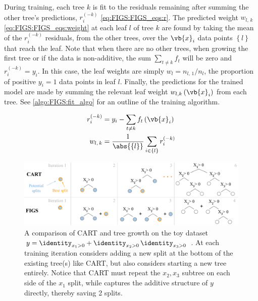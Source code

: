 During training, each tree $k$ is fit to the residuals remaining after summing the other tree's predictions,
$r_{i}^{\left(-k\right)}$ \cref{eq:FIGS:FIGS_eqs:r}.
The predicted weight $w_{l,\,k}$ \cref{eq:FIGS:FIGS_eqs:weight} at each leaf $l$ of tree $k$
are found by taking the mean of the $r_{i}^{\left(-k\right)}$ residuals, from the other trees,
over the $\vb{x}_{i}$ data points $\left\{l\right\}$ that reach the leaf.
Note that when there are no other trees,
\eg when growing the first tree or if the data is non-additive,
the sum $\sum_{t \neq k} f_{t}$ will be zero and $r_{i}^{\left(-k\right)} = y_{i}$.
In this case, the leaf weights are simply $w_{l} = n_{l,\,1}/n_{l}$,
\ie the proportion of positive $y_{i} = 1$ data points in leaf $l$.
Finally, the predictions for the trained model are made by
summing the relevant leaf weight $w_{l,k}\left(\vb{x}_{i}\right)$ from each tree.
See \cref{algo:FIGS:fit_algo} for an outline of the training algorithm.

\begin{subequations}\label{eq:FIGS_eqs}
\begin{align}
r_{i}^{\left(-k\right)} &= y_{i} - \sum_{t \neq k} f_{t}\left(\vb{x}_{i}\right) \label{eq:FIGS:FIGS_eqs:r} \\
w_{l,\,k} &= \frac{1}{\abs{\left\{l\right\}}} \sum_{i \in \left\{l\right\}} r_{i}^{\left(-k\right)} \label{eq:FIGS:FIGS_eqs:weight}
\end{align}
\end{subequations}

\begin{figure}[H]
\centering
\includegraphics[width=\textwidth]{figures/ml/figs_intro_fig}
\caption{
A comparison of CART and \figs tree growth on the toy dataset
$y = \identity_{x_{1} > 0} + \identity_{x_{2} > 0} \, \identity_{x_{3} > 0}$ \cite{FIGS}.
At each training iteration \figs considers adding a new split at the bottom of the existing tree(s) like CART,
but also considers starting a new tree entirely.
Notice that CART must repeat the $x_{2}, x_{3}$ subtree on each side of the $x_{1}$ split,
while \figs captures the additive structure of $y$ directly, thereby saving \num{2} splits.
}
\label{fig:FIGS:intro}
\end{figure}

